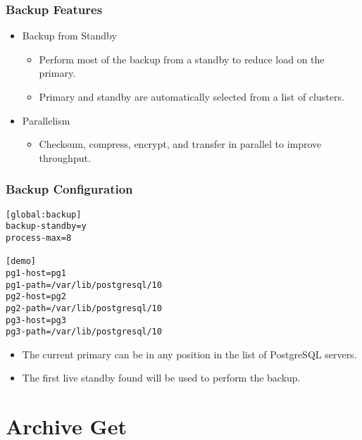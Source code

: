 \begin{frame}
    \frametitle{Backup Features}

    \begin{itemize}
        \item Backup from Standby

        \begin{itemize}
            \item Perform most of the backup from a standby to reduce load on the primary.\pause
            \item Primary and standby are automatically selected from a list of clusters.\pause
        \end{itemize}

        \item Parallelism

        \begin{itemize}
            \item Checksum, compress, encrypt, and transfer in parallel to improve throughput.
        \end{itemize}
    \end{itemize}
\end{frame}

\begin{frame}[fragile]
    \frametitle{Backup Configuration}

    \vspace{.75em}\begin{lstlisting}[title=pgbackrest.conf]
[global:backup]
backup-standby=y
process-max=8

[demo]
pg1-host=pg1
pg1-path=/var/lib/postgresql/10
pg2-host=pg2
pg2-path=/var/lib/postgresql/10
pg3-host=pg3
pg3-path=/var/lib/postgresql/10
    \end{lstlisting}\pause\vspace{1em}

    \begin{itemize}
        \item The current primary can be in any position in the list of PostgreSQL servers.\pause
        \item The first live standby found will be used to perform the backup.
    \end{itemize}
\end{frame}

\section{Archive Get}

